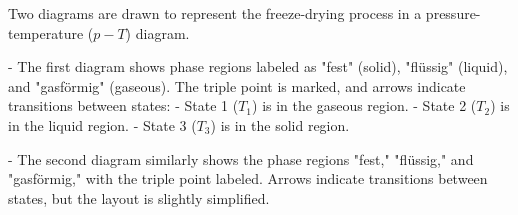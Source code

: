 Two diagrams are drawn to represent the freeze-drying process in a pressure-temperature (\( p-T \)) diagram.  

- The first diagram shows phase regions labeled as "fest" (solid), "flüssig" (liquid), and "gasförmig" (gaseous). The triple point is marked, and arrows indicate transitions between states:  
  - State 1 (\( T_1 \)) is in the gaseous region.  
  - State 2 (\( T_2 \)) is in the liquid region.  
  - State 3 (\( T_3 \)) is in the solid region.  

- The second diagram similarly shows the phase regions "fest," "flüssig," and "gasförmig," with the triple point labeled. Arrows indicate transitions between states, but the layout is slightly simplified.